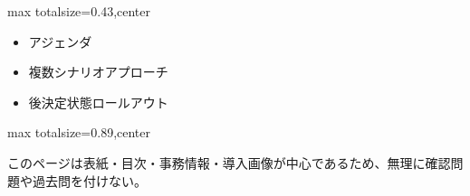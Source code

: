 \clearpage
{}
\begin{minipage}[t]{0.405\textwidth}
\begin{adjustbox}{max totalsize={\textwidth}{0.43\textheight},center}
\begin{minipage}{\textwidth}\scriptsize
{}\begin{itemize}
\item アジェンダ
\item 複数シナリオアプローチ
\item 後決定状態ロールアウト
\end{itemize}
\end{minipage}
\end{adjustbox}
\end{minipage}\hfill
\begin{minipage}[t]{0.58\textwidth}
\begin{adjustbox}{max totalsize={\textwidth}{0.89\textheight},center}
\begin{minipage}{\textwidth}\scriptsize
{}このページは表紙・目次・事務情報・導入画像が中心であるため、無理に確認問題や過去問を付けない。
\end{minipage}
\end{adjustbox}
\end{minipage}


